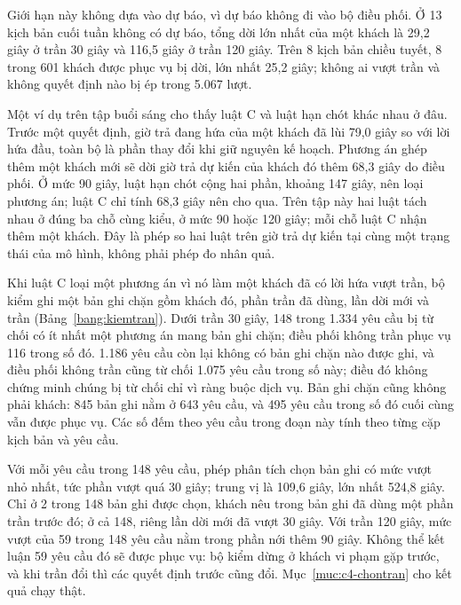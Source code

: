 Giới hạn này không dựa vào dự báo, vì dự báo không đi vào bộ điều phối. Ở 13 kịch bản cuối tuần không có dự báo, tổng
dời lớn nhất của một khách là 29,2 giây ở trần 30 giây và 116,5 giây ở trần 120 giây. Trên 8 kịch bản chiều tuyết,
8 trong 601 khách được phục vụ bị dời, lớn nhất 25,2 giây; không ai vượt trần và không quyết định nào bị ép trong
5.067 lượt.

Một ví dụ trên tập buổi sáng cho thấy luật C và luật hạn chót khác nhau ở đâu. Trước một quyết định, giờ trả đang hứa
của một khách đã lùi 79,0 giây so với lời hứa đầu, toàn bộ là phần thay đổi khi giữ nguyên kế hoạch. Phương án ghép
thêm một khách mới sẽ dời giờ trả dự kiến của khách đó thêm 68,3 giây do điều phối. Ở mức 90 giây, luật hạn chót cộng
hai phần, khoảng 147 giây, nên loại phương án; luật C chỉ tính 68,3 giây nên cho qua. Trên tập này hai luật tách nhau
ở đúng ba chỗ cùng kiểu, ở mức 90 hoặc 120 giây; mỗi chỗ luật C nhận thêm một khách. Đây là phép so hai luật trên
giờ trả dự kiến tại cùng một trạng thái của mô hình, không phải phép đo nhân quả.

Khi luật C loại một phương án vì nó làm một khách đã có lời hứa vượt trần, bộ kiểm ghi một bản ghi chặn gồm khách đó,
phần trần đã dùng, lần dời mới và trần (Bảng~\ref{bang:kiemtran}). Dưới trần 30 giây, 148 trong 1.334 yêu cầu bị từ
chối có ít nhất một phương án mang bản ghi chặn; điều phối không trần phục vụ 116 trong số đó. 1.186 yêu cầu còn lại
không có bản ghi chặn nào được ghi, và điều phối không trần cũng từ chối 1.075 yêu cầu trong số này; điều đó không
chứng minh chúng bị từ chối chỉ vì ràng buộc dịch vụ. Bản ghi chặn cũng không phải khách: 845 bản ghi nằm ở 643 yêu
cầu, và 495 yêu cầu trong số đó cuối cùng vẫn được phục vụ.
Các số đếm theo yêu cầu trong đoạn này tính theo từng cặp kịch bản và yêu cầu.

Với mỗi yêu cầu trong 148 yêu cầu, phép phân tích chọn bản ghi có mức vượt nhỏ nhất, tức phần vượt quá 30 giây; trung
vị là 109,6 giây, lớn nhất 524,8 giây. Chỉ ở 2 trong 148 bản ghi được chọn, khách nêu trong bản ghi đã dùng một phần
trần trước đó; ở cả 148, riêng lần dời mới đã vượt 30 giây. Với trần 120 giây, mức vượt của 59 trong 148 yêu cầu nằm
trong phần nới thêm 90 giây. Không thể kết luận 59 yêu cầu đó sẽ được phục vụ: bộ kiểm dừng ở khách vi phạm gặp trước,
và khi trần đổi thì các quyết định trước cũng đổi. Mục~\ref{muc:c4-chontran} cho kết quả chạy thật.

